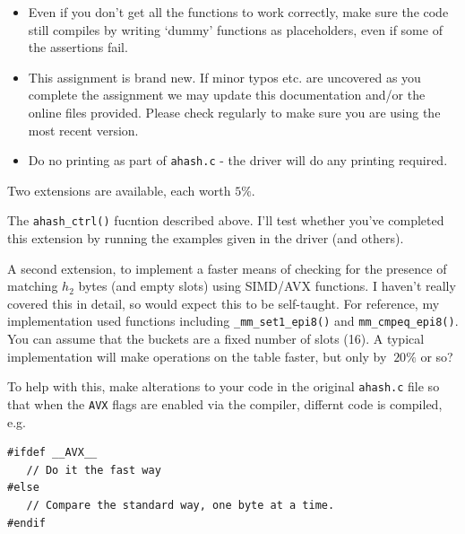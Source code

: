 \begin{exercise}
\begin{itemize}
\item Even if you don't get all the functions to work correctly, make
sure the code still compiles by writing `dummy' functions as placeholders,
even if some of the assertions fail.

\item  This assignment is brand new. If minor typos etc. are uncovered
as you complete the assignment we may update this documentation and/or
the online files provided. Please check regularly to make sure you are
using the most recent version.

\item Do no printing as part of \verb^ahash.c^ - the driver will do any printing required.

\end{itemize}

\vspace*{1ex}

\noindent
Two extensions are available, each worth $5\%$.

\noindent The \verb^ahash_ctrl()^ fucntion described above. I'll
test whether you've completed this extension by running the examples
given in the driver (and others).

\noindent A second extension, to implement a faster means of checking for
the presence of matching $h_2$ bytes (and empty slots) using SIMD/AVX
functions.  I haven't really covered this in detail, so would expect
this to be self-taught.  For reference, my implementation used functions
including  \verb^_mm_set1_epi8()^ and \verb^mm_cmpeq_epi8()^. You can
assume that the buckets are a fixed number of slots (16).  A typical
implementation will make operations on the table faster, but only by
$~20\%$ or so?

\noindent
To help with this, make alterations to your code in the original \verb^ahash.c^ file
so that when the \verb^AVX^ flags are enabled via the compiler, differnt code is
compiled, e.g.
\begin{verbatim}
#ifdef __AVX__
   // Do it the fast way
#else
   // Compare the standard way, one byte at a time.
#endif
\end{verbatim}

\end{exercise}
